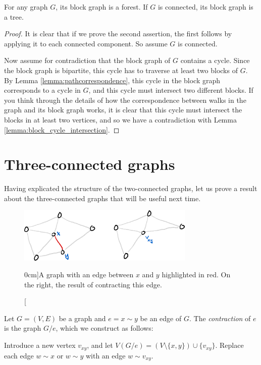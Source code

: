 \documentclass[nobib]{tufte-handout}
\begin{document}
\begin{lemma}
  For any graph $G$, its block graph is a forest. If $G$ is connected, its block graph is a tree.

  \begin{proof}
    It is clear that if we prove the second assertion, the first follows by applying it to each connected component. So assume $G$ is connected.

    Now assume for contradiction that the block graph of $G$ contains a cycle. Since the block graph is bipartite, this cycle has to traverse at least two blocks of $G$. By Lemma \ref{lemma:pathcorrespondence}, this cycle in the block graph corresponds to a cycle in $G$, and this cycle must intersect two different blocks. If you think through the details of how the correspondence between walks in the graph and its block graph works, it is clear that this cycle must intersect the blocks in at least two vertices, and so we have a contradiction with Lemma \ref{lemma:block_cycle_intersection}.
  \end{proof}
\end{lemma}

\section{Three-connected graphs}

Having explicated the structure of the two-connected graphs, let us prove a result about the three-connected graphs that will be useful next time.

\begin{figure}
  \centering
  \includegraphics[width=0.75\textwidth]{graphics/L10_connectivity/edge_contraction.png}
  \caption[][0cm]{A graph with an edge between $x$ and $y$ highlighted in red. On the right, the result of contracting this edge.}
  \label{fig:edge_contraction}
\end{figure}

\begin{definition}
  Let $G = (V,E)$ be a graph and $e = x\sim y$ be an edge of $G$. The \emph{contraction} of $e$ is the graph $G/e$, which we construct as follows:

  Introduce a new vertex $v_{xy}$, and let $V(G/e) = (V \setminus \{x,y\}) \cup \{v_{xy}\}$. Replace each edge $w \sim x$ or $w \sim y$ with an edge $w \sim v_{xy}$.
\end{definition}
\end{document}
